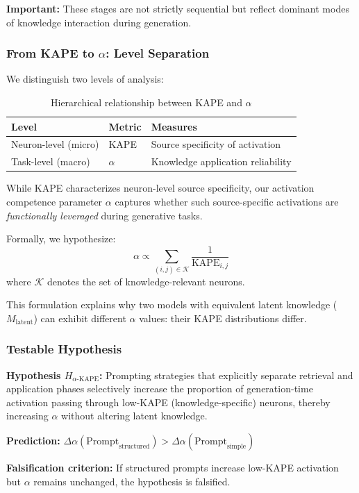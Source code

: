 \documentclass[11pt,a4paper]{article}
\begin{document}
\textbf{Important:} These stages are not strictly sequential but reflect dominant modes of knowledge interaction during generation.

\subsubsection{From KAPE to $\alpha$: Level Separation}

We distinguish two levels of analysis:

\begin{table}[H]
\centering
\caption{Hierarchical relationship between KAPE and $\alpha$}
\begin{tabular}{lll}
\toprule
\textbf{Level} & \textbf{Metric} & \textbf{Measures} \\
\midrule
Neuron-level (micro) & KAPE & Source specificity of activation \\
Task-level (macro) & $\alpha$ & Knowledge application reliability \\
\bottomrule
\end{tabular}
\end{table}

\begin{principlebox}
While KAPE characterizes neuron-level source specificity, our activation competence parameter $\alpha$ captures whether such source-specific activations are \emph{functionally leveraged} during generative tasks.

Formally, we hypothesize:
\begin{equation}
\alpha \propto \sum_{(i,j) \in \mathcal{K}} \frac{1}{\text{KAPE}_{i,j}}
\end{equation}
where $\mathcal{K}$ denotes the set of knowledge-relevant neurons.
\end{principlebox}

This formulation explains why two models with equivalent latent knowledge ($M_{\text{latent}}$) can exhibit different $\alpha$ values: their KAPE distributions differ.

\subsubsection{Testable Hypothesis}

\begin{assumptionbox}
\textbf{Hypothesis $H_{\alpha\text{-KAPE}}$:} Prompting strategies that explicitly separate retrieval and application phases selectively increase the proportion of generation-time activation passing through low-KAPE (knowledge-specific) neurons, thereby increasing $\alpha$ without altering latent knowledge.

\textbf{Prediction:} $\Delta\alpha(\text{Prompt}_{\text{structured}}) > \Delta\alpha(\text{Prompt}_{\text{simple}})$

\textbf{Falsification criterion:} If structured prompts increase low-KAPE activation but $\alpha$ remains unchanged, the hypothesis is falsified.
\end{assumptionbox}
\end{document}

